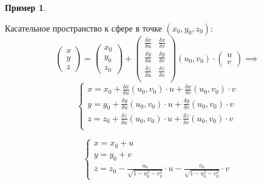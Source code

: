 \documentclass{report}
\theoremstyle{definition}
\newtheorem{example}{Пример}
\begin{document}
\begin{example}
\begin{enumerate}
          Касательное пространство к сфере в точке $(x_0,y_0,z_0)$:
          \begin{equation*}
            \left(\begin{array}{c}
              x \\
              y \\
              z
            \end{array}\right) = \left(\begin{array}{c}
              x_0 \\
              y_0 \\
              z_0
            \end{array}\right) + \left(\begin{array}{cc}
              \frac{\delta x}{\delta u} & \frac{\delta x}{\delta v} \\
              \frac{\delta y}{\delta u} & \frac{\delta y}{\delta v} \\
              \frac{\delta z}{\delta u} & \frac{\delta z}{\delta v} \\
            \end{array}\right) (u_0,v_0) \cdot \left(\begin{array}{c}
              u \\
              v
            \end{array}\right) \implies
          \end{equation*}
          \begin{equation*}
            \left\{\begin{array}{l}
              x = x_0 + \frac{\delta x}{\delta u}(u_0,v_0) \cdot u + \frac{\delta x}{\delta v}(u_0,v_0)\cdot v \\
              y = y_0 + \frac{\delta y}{\delta u}(u_0,v_0) \cdot u + \frac{\delta y}{\delta v}(u_0,v_0)\cdot v \\
              z = z_0 + \frac{\delta z}{\delta u}(u_0,v_0) \cdot u + \frac{\delta z}{\delta v}(u_0,v_0)\cdot v \\
            \end{array}\right.
          \end{equation*}

          \begin{equation*}
            \left\{\begin{array}{l}
              x = x_0 + u \\
              y = y_0 + v \\
              z = z_0 - \frac{u_0}{\sqrt{1 - u_0^2 - v_0^2}}\cdot u - \frac{v_0}{\sqrt{1 - u_0^2 - v_0^2}}\cdot v
            \end{array}\right.
          \end{equation*}
  \end{enumerate}
\end{example}
\end{document}
